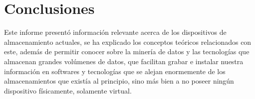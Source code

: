 \documentclass[10pt,journal]{IEEEtran}
\begin{document}
\section{\textbf{Conclusiones}}
Este informe presentó información relevante acerca de los dispositivos de almacenamiento actuales, se ha explicado los conceptos teóricos relacionados con este, además de permitir conocer sobre la minería de datos y las tecnologías que almacenan grandes volúmenes de datos, que facilitan grabar e instalar nuestra información en softwares y tecnologías que se alejan enormemente de los almacenamientos que existía al principio, sino más bien a no poseer ningún dispositivo físicamente, solamente virtual. 
\medskip

\end{document}
